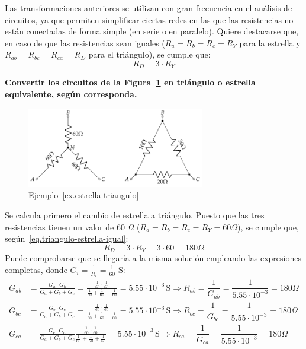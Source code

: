 	Las transformaciones anteriores se utilizan con gran frecuencia en el análisis de circuitos, ya que permiten simplificar ciertas redes en las que las resistencias no están
	conectadas de forma simple (en serie o en paralelo). Quiere destacarse que, en caso de que las resistencias sean iguales ($R_a=R_b=R_c=R_Y$ para la estrella y $R_{ab}=R_{bc}=R_{ca}=R_D$ para el triángulo), se cumple que: 
	\begin{equation}\label{eq.triangulo-estrella-igual}
		\boxed{R_D=3\cdot R_Y}
	\end{equation}
	
	\begin{example}\label{ex.estrella-triangulo}
	\textbf{Convertir los circuitos de la Figura~\ref{fig.ejercicio7-bt1} en triángulo o estrella equivalente, según corresponda. }
 \begin{figure}[H]
 		\centering
\includegraphics[height=3.5cm]{../figs/ej7_BT1.pdf}
 		\caption{Ejemplo~\ref{ex.estrella-triangulo}}
 		\label{fig.ejercicio7-bt1}
 	\end{figure}
 	
 	Se calcula primero el cambio de estrella a triángulo. Puesto que las tres resistencias tienen un valor de 60 $\Omega$ ($R_a=R_b=R_c=R_Y=60\Omega$), se cumple que, según~\eqref{eq.triangulo-estrella-igual}: 
	\begin{equation*}
		R_D=3\cdot R_Y=3\cdot 60=180\Omega
	\end{equation*}
	Puede comprobarse que se llegaría a la misma solución empleando las expresiones completas, donde $G_i=\frac{1}{R_i}=\frac{1}{60}$ S: 
	\begin{align*}
			G_{ab} &= \frac{G_a \cdot G_b}{G_a + G_b + G_c}=\frac{\frac{1}{60} \cdot \frac{1}{60}}{\frac{1}{60} + \frac{1}{60} + \frac{1}{60}}=5.55\cdot 10^{-3}\,\text{S}\Rightarrow R_{ab}=\dfrac{1}{G_{ab}}=\dfrac{1}{5.55\cdot 10^{-3}}=180\Omega\\[10pt]
			G_{bc} &= \frac{G_b \cdot G_c}{G_a + G_b + G_c}=\frac{\frac{1}{60} \cdot \frac{1}{60}}{\frac{1}{60} + \frac{1}{60} + \frac{1}{60}}=5.55\cdot 10^{-3}\,\text{S}\Rightarrow R_{bc}=\dfrac{1}{G_{bc}}=\dfrac{1}{5.55\cdot 10^{-3}}=180\Omega\\[10pt]
			G_{ca} &= \frac{G_c \cdot G_a}{G_a + G_b + G_c}\frac{\frac{1}{60} \cdot \frac{1}{60}}{\frac{1}{60} + \frac{1}{60} + \frac{1}{60}}=5.55\cdot 10^{-3}\,\text{S}\Rightarrow R_{ca}=\dfrac{1}{G_{ca}}=\dfrac{1}{5.55\cdot 10^{-3}}=180\Omega
		\end{align*}


\end{example}

